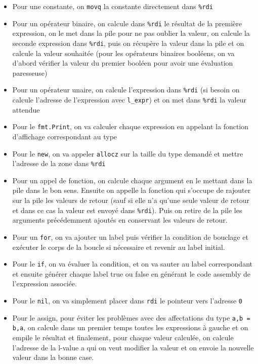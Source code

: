 \documentclass[10pt]{report}
\begin{document}
\begin{itemize}
  \item Pour une constante, on \verb|movq| la constante directement dans \verb|%rdi|
  \item Pour un opérateur binaire, on calcule dans \verb|%rdi| le résultat de la première expression, on le met dans la pile pour ne pas oublier la valeur, on calcule la seconde expression dans \verb|%rdi|, puis on récupère la valeur dans la pile et on calcule la valeur souhaitée (pour les opérateurs binaires booléens, on va d'abord vérifier la valeur du premier booléen pour avoir une évaluation paresseuse)
  \item Pour un opérateur unaire, on calcule l'expression dans \verb|%rdi| (si besoin on calcule l'adresse de l'expression avec \verb|l_expr|) et on met dans \verb|%rdi| la valeur attendue
  \item Pour le \verb|fmt.Print|, on va calculer chaque expression en appelant la fonction d'affichage correspondant au type
  \item Pour le \verb|new|, on va appeler \verb|allocz| sur la taille du type demandé et mettre l'adresse de la zone dans \verb|%rdi|
  \item Pour un appel de fonction, on calcule chaque argument en le mettant dans la pile dans le bon sens. Ensuite on appelle la fonction qui s'occupe de rajouter sur la pile les valeurs de retour (sauf si elle n'a qu'une seule valeur de retour et dans ce cas la valeur est envoyé dans \verb|%rdi|). Puis on retire de la pile les arguments précédemment ajoutés en conservant les valeurs de retour.
  \item Pour un \verb|for|, on va ajouter un label puis vérifier la condition de bouclage et exécuter le corps de la boucle si nécessaire et revenir au label initial.
  \item Pour le \verb|if|, on va évaluer la condition, et on va sauter au label correspondant et ensuite générer chaque label true ou false en générant le code assembly de l'expression associée.
  \item Pour le \verb|nil|, on va simplement placer dans \verb|rdi| le pointeur vers l'adresse \verb|0|
  \item Pour le assign, pour éviter les problèmes avec des affectations du type \verb|a,b = b,a|, on calcule dans un premier temps toutes les expressions à gauche et on empile le résultat et finalement, pour chaque valeur calculée, on calcule l'adresse de la l-value a qui on veut modifier la valeur et on envoie la nouvelle valeur dans la bonne case.

\end{itemize}
\end{document}
